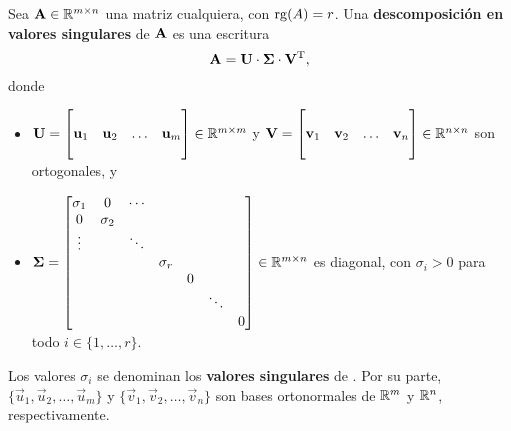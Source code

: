 Sea $\mathbf{A} \in \mathbb{R}^{m \times n}$ una matriz cualquiera, con $\operatorname{rg}(A) = r$.
Una \textbf{descomposición en valores singulares} de $\mathbf{A}$ es una escritura
\[ \mathbf{A} = \mathbf{U} \cdot \mathbf{\Sigma} \cdot \mathbf{V}^{\mathrm{T}}, \]
donde
\begin{itemize} \vspace{.6em}
\item $\mathbf{U} = \begin{bmatrix}
                  &           &        &           \\
        \mathbf{u}_1 & \mathbf{u}_2 & \dots  & \mathbf{u}_m \\
                  &           &        &           \\
    \end{bmatrix} \in \mathbb{R}^{m \times m}$ y
    $\mathbf{V} = \begin{bmatrix}
                  &           &        &           \\
        \mathbf{v}_1 & \mathbf{v}_2 & \dots  & \mathbf{v}_n \\
                  &           &        &           \\
    \end{bmatrix} \in \mathbb{R}^{n \times n}$ son ortogonales, y \vspace{.6em}
\item $\mathbf{\Sigma} = \begin{bmatrix}
\sigma_1 & 0        & \cdots   &    &          &          &          \\
0        & \sigma_2 &          &          &          &          &          \\
\vdots   &          & \ddots   &          &          &          &          \\
         &          &          & \sigma_r &          &          &          \\
         &          &          &          & 0        &          &          \\
         &          &          &          &          & \ddots   &          \\
         &          &          &          &          &          & 0
\end{bmatrix} \in \mathbb{R}^{m \times n}$ es diagonal,
    con $\sigma_i > 0$ para todo $i \in \{ 1, \dots, r \}$.
\end{itemize} \vspace{.6em}

Los valores $\sigma_i$ se denominan los \textbf{valores singulares} de .
Por su parte, $\lbrace \vec{u}_1, \vec{u}_2, \dots, \vec{u}_m \rbrace$ y
$\lbrace \vec{v}_1, \vec{v}_2, \dots, \vec{v}_n \rbrace$
son bases ortonormales de $\mathbb{R}^m$ y $\mathbb{R}^n$, respectivamente.

